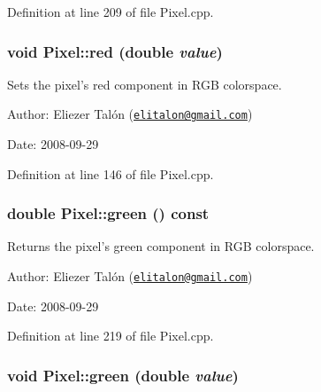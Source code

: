 Definition at line 209 of file Pixel.cpp.\hypertarget{class_pixel_cc64470d744c5fc5b26cedb027366b5d}{
\subsubsection[red]{\setlength{\rightskip}{0pt plus 5cm}void Pixel::red (double {\em value})}}
\label{class_pixel_cc64470d744c5fc5b26cedb027366b5d}


Sets the pixel's red component in RGB colorspace. 

\begin{Desc}
\item[Author:]Eliezer Talón (\href{mailto:elitalon@gmail.com}{\tt elitalon@gmail.com}) \end{Desc}
\begin{Desc}
\item[Date:]2008-09-29 \end{Desc}


Definition at line 146 of file Pixel.cpp.\hypertarget{class_pixel_71606a21fe4efc55a5ce5bb318b629f7}{
\subsubsection[green]{\setlength{\rightskip}{0pt plus 5cm}double Pixel::green () const}}
\label{class_pixel_71606a21fe4efc55a5ce5bb318b629f7}


Returns the pixel's green component in RGB colorspace. 

\begin{Desc}
\item[Author:]Eliezer Talón (\href{mailto:elitalon@gmail.com}{\tt elitalon@gmail.com}) \end{Desc}
\begin{Desc}
\item[Date:]2008-09-29 \end{Desc}


Definition at line 219 of file Pixel.cpp.\hypertarget{class_pixel_98aaded2bc7bf4708edaaf2445acae0f}{
\subsubsection[green]{\setlength{\rightskip}{0pt plus 5cm}void Pixel::green (double {\em value})}}
\label{class_pixel_98aaded2bc7bf4708edaaf2445acae0f}


